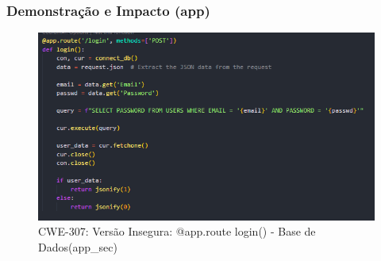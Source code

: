 \subsubsection{Demonstração e Impacto (app)}

\begin{figure}[H]
  \centering
  \includegraphics[width=0.8\linewidth]{images/CWE307-unsafe-app.png}
  \caption{CWE-307: Versão Insegura: @app.route login() - Base de Dados(app\_sec)}
  \label{fig:cwe307-unsafe-app}
\end{figure}

